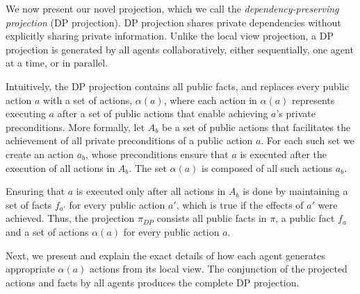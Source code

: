 \documentclass[letterpaper]{article}
\theoremstyle{definition}
\begin{document}
We now present our novel projection, which we call the {\em dependency-preserving projection} (DP projection). DP projection shares private dependencies without explicitly sharing private information. Unlike the local view projection, a DP projection is generated by all agents collaboratively, either sequentially, one agent at a time, or in parallel.

Intuitively, the DP projection contains all public facts, and replaces every public action $a$ with a set of actions, $\alpha(a)$, where each action in $\alpha(a)$ represents executing $a$ after a set of public actions that enable achieving $a$'s private preconditions.
More formally, let $A_b$ be a set of public actions that facilitates the achievement of all private preconditions of a public action $a$. For each such set we create an action $a_b$, whose preconditions ensure that $a$ is executed after the execution of all actions in $A_b$. The set $\alpha(a)$ is composed of all such actions $a_b$.

Ensuring that $a$ is executed only after all actions in $A_b$ is done by maintaining a set of facts $f_{a'}$ for every public action $a'$, which is true if the effects of $a'$ were achieved. Thus, the projection $\pi_{DP}$ consists all public facts in $\pi$, a public fact $f_a$ and a set of actions $\alpha(a)$ for every public action $a$.

Next, we present and explain the exact details of how each agent generates appropriate $\alpha(a)$ actions from its local view. The conjunction of the projected actions and facts by all agents produces the complete DP projection.






\end{document}
